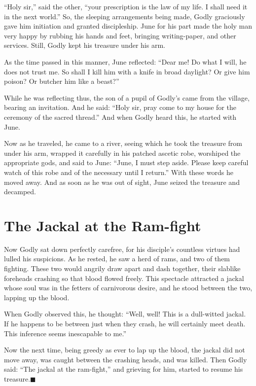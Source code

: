 \documentclass[article, twoside, 14pt]{memoir}
\newcommand{\qed}{\hfill \ensuremath{\blacksquare}}
\begin{document}
``Holy sir,'' said the other,
``your prescription is the law of my life. I shall need it in the next world.''
So, the sleeping arrangements being made, Godly graciously
gave him initiation and granted discipleship. June for his part
made the holy man very happy by rubbing his hands and feet,
bringing writing-paper, and other services. Still, Godly kept his
treasure under his arm.

As the time passed in this manner, June reflected:
``Dear me! Do what I will, he does not trust me. So shall I kill him with a knife in broad daylight? Or give him poison? Or butcher him like a beast?''

While he was reflecting thus, the son of a pupil of Godly's came
from the village, bearing an invitation. And he said:
``Holy sir, pray come to my house for the ceremony of the sacred thread.''
And when Godly heard this, he started with June.

Now as he traveled, he came to a river, seeing which he took the
treasure from under his arm, wrapped it carefully in his patched
ascetic robe, worshiped the appropriate gods, and said to June:
``June, I must step aside. Please keep careful watch of this robe and of the necessary until I return.''
With these words he moved away. And as soon as he was out of sight,
June seized the treasure and decamped.

\chapter{The Jackal at the Ram-fight}

\label{s6}

Now Godly sat down perfectly carefree, for his disciple's countless
virtues had lulled his suspicions. As he rested, he saw a herd of
rams, and two of them fighting. These two would angrily draw apart
and dash together, their slablike foreheads crashing so that blood
flowed freely. This spectacle attracted a jackal whose soul was in
the fetters of carnivorous desire, and he stood between the two,
lapping up the blood.

When Godly observed this, he thought:
``Well, well! This is a dull-witted jackal. If he happens to be between just when they crash, he will certainly meet death. This inference seems inescapable to me.''

Now the next time, being greedy as ever to lap up the blood, the
jackal did not move away, was caught between the crashing heads,
and was killed. Then Godly said: ``The jackal at the ram-fight,''
and grieving for him, started to resume his
treasure.\hyperref[s6]{\qed}
\end{document}
